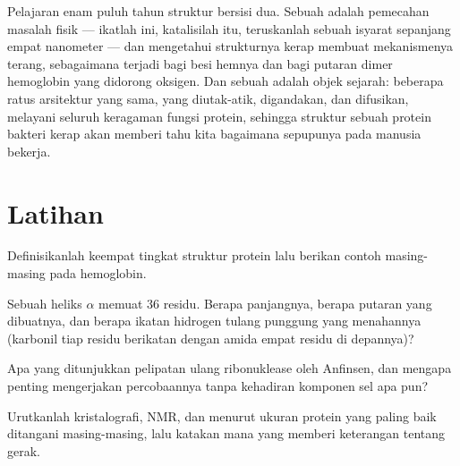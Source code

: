 \begin{remark}\label{rem:b3:structural-biology:sf}
Pelajaran enam puluh tahun struktur bersisi dua. Sebuah  adalah
pemecahan masalah fisik --- ikatlah ini, katalisilah itu, teruskanlah sebuah
isyarat sepanjang empat nanometer --- dan mengetahui strukturnya kerap membuat
mekanismenya terang, sebagaimana terjadi bagi besi hemnya dan bagi putaran
dimer hemoglobin yang didorong oksigen. Dan sebuah  adalah objek
sejarah: beberapa ratus arsitektur yang sama, yang diutak-atik, digandakan,
dan difusikan, melayani seluruh keragaman fungsi protein, sehingga struktur
sebuah protein bakteri kerap akan memberi tahu kita bagaimana sepupunya pada
manusia bekerja.
\end{remark}

\section{Latihan}

\begin{exercise}[$\star$]\label{exo:b3:structural-biology:1}
Definisikanlah keempat tingkat struktur protein lalu berikan contoh
masing-masing pada hemoglobin.
\end{exercise}

\begin{exercise}[$\star$]\label{exo:b3:structural-biology:2}
Sebuah heliks $\alpha$ memuat $36$ residu. Berapa panjangnya, berapa
putaran yang dibuatnya, dan berapa ikatan hidrogen tulang punggung yang
menahannya (karbonil tiap residu berikatan dengan amida empat residu di depannya)?
\end{exercise}

\begin{exercise}[$\star$]\label{exo:b3:structural-biology:3}
Apa yang ditunjukkan pelipatan ulang ribonuklease oleh Anfinsen, dan mengapa
penting mengerjakan percobaannya tanpa kehadiran komponen sel apa pun?
\end{exercise}

\begin{exercise}[$\star$]\label{exo:b3:structural-biology:4}
Urutkanlah kristalografi, NMR, dan  menurut ukuran
protein yang paling baik ditangani masing-masing, lalu katakan mana yang
memberi keterangan tentang gerak.
\end{exercise}

